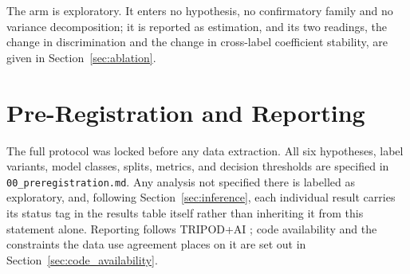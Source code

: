 The arm is exploratory. It enters no hypothesis, no confirmatory family and no
variance decomposition; it is reported as estimation, and its two readings, the change in discrimination and the change in cross-label coefficient
stability, are given in Section~\ref{sec:ablation}.


\section{Pre-Registration and Reporting}

The full protocol was locked before any data extraction. All six hypotheses,
label variants, model classes, splits, metrics, and decision thresholds are
specified in \texttt{00\_preregistration.md}. Any analysis not specified there
is labelled as exploratory, and, following
Section~\ref{sec:inference}, each individual result carries its status tag in
the results table itself rather than inheriting it from this statement alone.
Reporting follows TRIPOD+AI \cite{collins2024tripodai}; code availability and
the constraints the data use agreement places on it are set out in
Section~\ref{sec:code_availability}.
